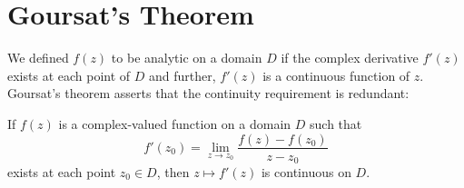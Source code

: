 \documentclass[12pt, a4paper, oneside, openright, titlepage]{book}
\begin{document}
\section{Goursat's Theorem}

We defined $f(z)$ to be analytic on a domain $D$ if the complex derivative $f'(z)$ exists at each point of $D$ and further, $f'(z)$ is a continuous function of $z$. Goursat's theorem asserts that the continuity requirement is redundant:

\begin{namthm}
    If $f(z)$ is a complex-valued function on a domain $D$ such that \begin{equation*}
        f'(z_0) = \lim\limits_{z\rightarrow z_0}\frac{f(z)-f(z_0)}{z-z_0}
    \end{equation*}
    exists at each point $z_0 \in D$, then $z\mapsto f'(z)$ is continuous on $D$.
\end{namthm}
\end{document}
